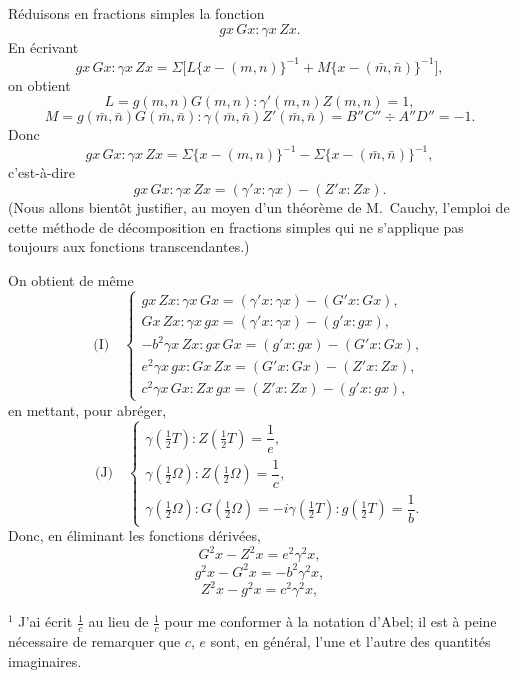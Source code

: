 \documentclass[12pt,a4paper]{article}
\begin{document}
\newpage
\setcounter{page}{172}

R\'eduisons en fractions simples la fonction
\[
gx\,Gx : \gamma x\,Zx.
\]
En \'ecrivant
\[
gx\,Gx : \gamma x\,Zx = \Sigma\bigl[L\{x - (m,n)\}^{-1} + M\{x - (\bar m,\bar n)\}^{-1}\bigr],
\]
on obtient
\[
L = g(m,n)G(m,n) : \gamma'(m,n)Z(m,n) = 1,
\]
\[
M = g(\bar m,\bar n)G(\bar m,\bar n) : \gamma(\bar m,\bar n)Z'(\bar m,\bar n) = B''C'' \div A''D'' = -1.
\]
Donc
\[
gx\,Gx : \gamma x\,Zx = \Sigma\{x - (m,n)\}^{-1} - \Sigma\{x - (\bar m,\bar n)\}^{-1},
\]
c'est-\`a-dire
\[
gx\,Gx : \gamma x\,Zx = (\gamma' x : \gamma x) - (Z' x : Z x).
\]
(Nous allons bient\^ot justifier, au moyen d'un th\'eor\`eme de M.~Cauchy, l'emploi de cette m\'ethode de d\'ecomposition en fractions simples qui ne s'applique pas toujours aux fonctions transcendantes.)

On obtient de m\^eme
\[
\text{(I)}\quad
\begin{cases}
g x\,Z x : \gamma x\,G x = (\gamma' x : \gamma x) - (G' x : G x),\\
G x\,Z x : \gamma x\,g x = (\gamma' x : \gamma x) - (g' x : g x),\\
-b^2 \gamma x\,Z x : g x\,G x = (g' x : g x) - (G' x : G x),\\
e^2 \gamma x\,g x : G x\,Z x = (G' x : G x) - (Z' x : Z x),\\
c^2 \gamma x\,G x : Z x\,g x = (Z' x : Z x) - (g' x : g x),
\end{cases}
\]
en mettant, pour abr\'eger,
\[
\text{(J)}\quad
\begin{cases}
\gamma(\tfrac12 T) : Z(\tfrac12 T) = \dfrac{1}{e},\\[4pt]
\gamma(\tfrac12\Omega) : Z(\tfrac12\Omega) = \dfrac{1}{c},\\[4pt]
\gamma(\tfrac12\Omega) : G(\tfrac12\Omega) = -i\gamma(\tfrac12 T) : g(\tfrac12 T) = \dfrac{1}{b}.
\end{cases}
\]
Donc, en \'eliminant les fonctions d\'eriv\'ees,
\[
G^2 x - Z^2 x = e^2\gamma^2 x,
\]
\[
g^2 x - G^2 x = -b^2\gamma^2 x,
\]
\[
Z^2 x - g^2 x = c^2\gamma^2 x,
\]
\medskip

\footnotesize
$^1$ J'ai \'ecrit $\tfrac{1}{c}$ au lieu de $\tfrac{1}{c}$ pour me conformer \`a la notation d'Abel; il est \`a peine n\'ecessaire de remarquer que $c$, $e$ sont, en g\'en\'eral, l'une et l'autre des quantit\'es imaginaires.
\normalsize
\end{document}
